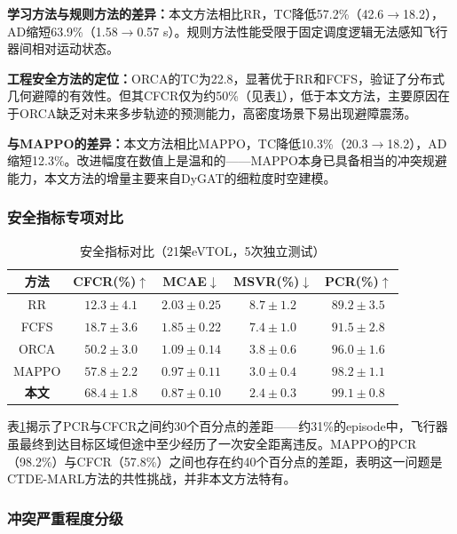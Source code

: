 \documentclass[12pt,a4paper,UTF8]{ctexart}
\begin{document}
\textbf{学习方法与规则方法的差异：}本文方法相比RR，TC降低57.2\%（42.6$\to$18.2），AD缩短63.9\%（1.58$\to$0.57 s）。规则方法性能受限于固定调度逻辑无法感知飞行器间相对运动状态。

\textbf{工程安全方法的定位：}ORCA的TC为22.8，显著优于RR和FCFS，验证了分布式几何避障的有效性。但其CFCR仅为约50\%（见表\ref{tab:safety}），低于本文方法，主要原因在于ORCA缺乏对未来多步轨迹的预测能力，高密度场景下易出现避障震荡。

\textbf{与MAPPO的差异：}本文方法相比MAPPO，TC降低10.3\%（20.3$\to$18.2），AD缩短12.3\%。改进幅度在数值上是温和的——MAPPO本身已具备相当的冲突规避能力，本文方法的增量主要来自DyGAT的细粒度时空建模。

\subsubsection{安全指标专项对比}

\begin{table}[H]
    \centering
    \caption{安全指标对比（21架eVTOL，5次独立测试）}
    \label{tab:safety}
    \begin{tabular}{|c|c|c|c|c|}
        \hline
        \textbf{方法} & \textbf{CFCR(\%)$\uparrow$} & \textbf{MCAE$\downarrow$} & \textbf{MSVR(\%)$\downarrow$} & \textbf{PCR(\%)$\uparrow$} \\
        \hline
        RR & $12.3\pm4.1$ & $2.03\pm0.25$ & $8.7\pm1.2$ & $89.2\pm3.5$ \\
        FCFS & $18.7\pm3.6$ & $1.85\pm0.22$ & $7.4\pm1.0$ & $91.5\pm2.8$ \\
        ORCA & $50.2\pm3.0$ & $1.09\pm0.14$ & $3.8\pm0.6$ & $96.0\pm1.6$ \\
        MAPPO & $57.8\pm2.2$ & $0.97\pm0.11$ & $3.0\pm0.4$ & $98.2\pm1.1$ \\
        \textbf{本文} & $\mathbf{68.4\pm1.8}$ & $\mathbf{0.87\pm0.10}$ & $\mathbf{2.4\pm0.3}$ & $\mathbf{99.1\pm0.8}$ \\
        \hline
    \end{tabular}
\end{table}

表\ref{tab:safety}揭示了PCR与CFCR之间约30个百分点的差距——约31\%的episode中，飞行器虽最终到达目标区域但途中至少经历了一次安全距离违反。MAPPO的PCR（98.2\%）与CFCR（57.8\%）之间也存在约40个百分点的差距，表明这一问题是CTDE-MARL方法的共性挑战，并非本文方法特有。

\subsubsection{冲突严重程度分级}
\end{document}
